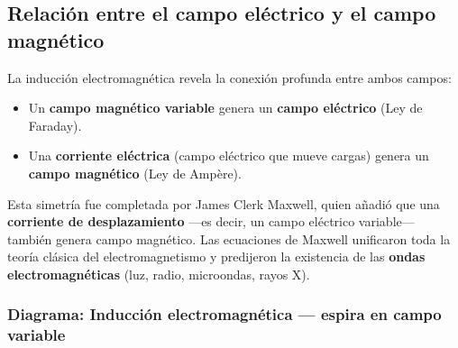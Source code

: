 \subsection{Relación entre el campo eléctrico y el campo magnético}

\begin{seccion}
\begin{seccion}
La inducción electromagnética revela la conexión profunda entre ambos campos:
\begin{itemize}
    \item Un \textbf{campo magnético variable} genera un \textbf{campo eléctrico} (Ley de Faraday).
    \item Una \textbf{corriente eléctrica} (campo eléctrico que mueve cargas) genera un \textbf{campo magnético} (Ley de Ampère).
\end{itemize}

Esta simetría fue completada por James Clerk Maxwell, quien añadió que una \textbf{corriente de desplazamiento} —es decir, un campo eléctrico variable— también genera campo magnético. Las ecuaciones de Maxwell unificaron toda la teoría clásica del electromagnetismo y predijeron la existencia de las \textbf{ondas electromagnéticas} (luz, radio, microondas, rayos X).
\end{seccion}
\end{seccion}

\subsubsection{Diagrama: Inducción electromagnética — espira en campo variable}

